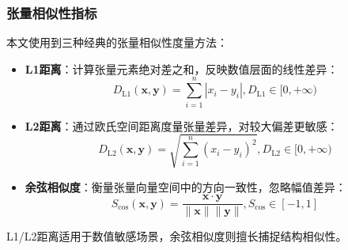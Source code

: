 \subsubsection{张量相似性指标}
\label{sec:tensor-similarity-metric}
\par
本文使用到三种经典的张量相似性度量方法：
\begin{itemize}
    \item \textbf{L1距离}：计算张量元素绝对差之和，反映数值层面的线性差异\cite{Distance}：
    \begin{equation}
        D_{\text{L1}}(\mathbf{x},\mathbf{y}) = \sum_{i=1}^{n} |x_i - y_i|, 
        D_{\text{L1}} \in [0,+\infty)
    \end{equation}
    \item \textbf{L2距离}：通过欧氏空间距离度量张量差异，对较大偏差更敏感\cite{Distance}：
    \begin{equation}
        D_{\text{L2}}(\mathbf{x},\mathbf{y}) = \sqrt{\sum_{i=1}^{n} (x_i - y_i)^2},
        D_{\text{L2}} \in [0,+\infty)
    \end{equation}
    \item \textbf{余弦相似度}：衡量张量向量空间中的方向一致性，忽略幅值差异\cite{CosineSimilarity}：
    \begin{equation}
        S_{\cos}(\mathbf{x},\mathbf{y}) = \frac{\mathbf{x} \cdot \mathbf{y}}{\|\mathbf{x}\| \|\mathbf{y}\|},
        S_{\cos} \in [-1,1]
    \end{equation}
\end{itemize}
\par
L1/L2距离适用于数值敏感场景，余弦相似度则擅长捕捉结构相似性。

